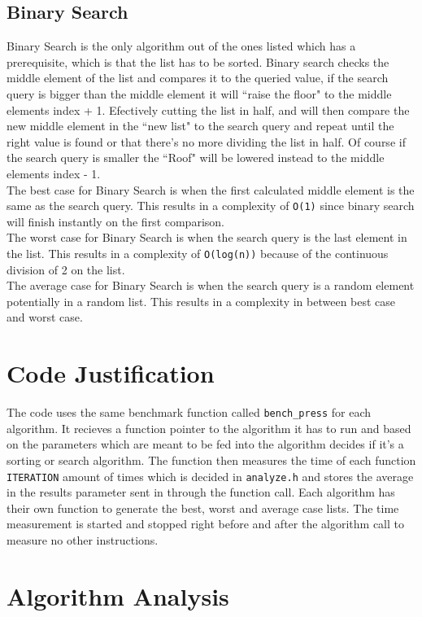 \documentclass{article}
\begin{document}
    \subsection{Binary Search}
    Binary Search is the only algorithm out of the ones listed which has a prerequisite, which is that the list has to be sorted. Binary search checks the middle element of the list and compares it to the queried value,
    if the search query is bigger than the middle element it will ``raise the floor" to the middle elements index + 1. Efectively cutting the list in half, and will then compare the new middle
    element in the ``new list" to the search query and repeat until the right value is found or that there's no more dividing the list in half. Of course if the search query is smaller the ``Roof" will be lowered instead to the middle elements index - 1.\\
    The best case for Binary Search is when the first calculated middle element is the same as the search query. This results in a complexity of \texttt{O(1)} since binary search will finish
    instantly on the first comparison.\\
    The worst case for Binary Search is when the search query is the last element in the list. This results in a complexity of \texttt{O(log(n))} because of the continuous division of 2 on the list.\\
    The average case for Binary Search is when the search query is a random element potentially in a random list. This results in a complexity in between best case and worst case.  
    \section{Code Justification}
    The code uses the same benchmark function called \texttt{bench\_press} for each algorithm. It recieves a function pointer to the algorithm it has to run and based on the parameters
    which are meant to be fed into the algorithm decides if it's a sorting or search algorithm. The function then measures the time of each function \texttt{ITERATION} amount of times which is
    decided in \texttt{analyze.h} and stores the average in the results parameter sent in through the function call. Each algorithm has their own function to generate the best, worst and average case lists.
    The time measurement is started and stopped right before and after the algorithm call to measure no other instructions.
    \newpage
    \section{Algorithm Analysis}
\end{document}
